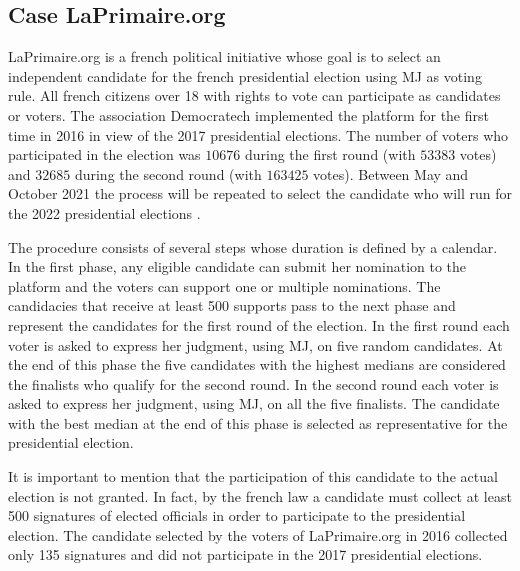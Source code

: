 \documentclass[version=3.21, pagesize, twoside=off, bibliography=totoc, DIV=calc, fontsize=12pt, a4paper]{scrartcl}
\begin{document}
\subsection{Case LaPrimaire.org}
\label{sec:primaire}
LaPrimaire.org \citep{LaPrimaire} is a french political initiative whose goal is to select an independent candidate for the french presidential election using \acs{MJ} as voting rule. All french citizens over 18 with rights to vote can participate as candidates or voters. The association Democratech implemented the platform for the first time in 2016 in view of the 2017 presidential elections. The number of voters who participated in the election was $10676$ during the first round (with $53383$ votes) and $32685$ during the second round (with $163425$ votes). Between May and October 2021 the process will be repeated to select the candidate who will run for the 2022 presidential elections \citep{LaPrimaire2022}.

The procedure consists of several steps whose duration is defined by a calendar. In the first phase, any eligible candidate can submit her nomination to the platform and the voters can support one or multiple nominations. The candidacies that receive at least 500 supports pass to the next phase and represent the candidates for the first round of the election. In the first round each voter is asked to express her judgment, using \acs{MJ}, on five random candidates. At the end of this phase the five candidates with the highest medians are considered the finalists who qualify for the second round. In the second round each voter is asked to express her judgment, using \acs{MJ}, on all the five finalists. The candidate with the best median at the end of this phase is selected as representative for the presidential election.

It is important to mention that the participation of this candidate to the actual election is not granted. In fact, by the french law a candidate must collect at least 500 signatures of elected officials in order to participate to the presidential election. The candidate selected by the voters of LaPrimaire.org in 2016 collected only 135 signatures and did not participate in the 2017 presidential elections.  

\end{document}
